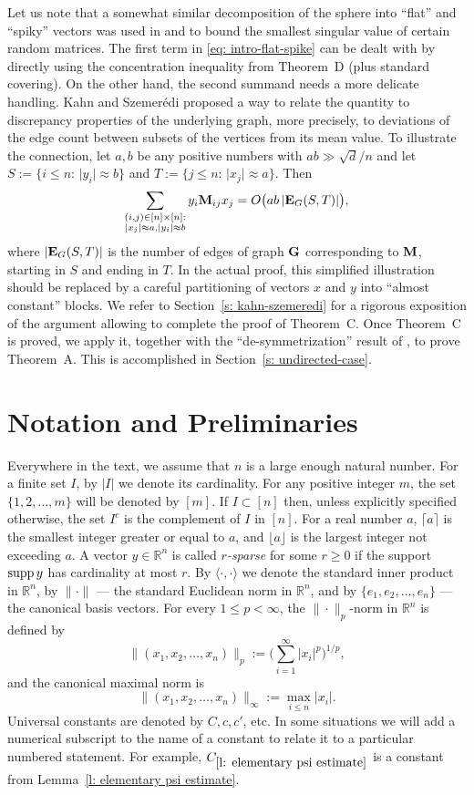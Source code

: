 \documentclass[12pt]{article}
\theoremstyle{definition}
\theoremstyle{plain}
\newcommand{\R}{\mathbb{R}}
\newcommand{\supp}{{\rm supp\,}}
\def\nrangr{G}
\def\rangr{{\bf{}G}}
\def\ranmtx{{\bf{}M}}
\def\edg{{\bf E}_{\nrangr}}
\begin{document}
Let us note that a somewhat similar decomposition of the sphere into ``flat''
and ``spiky'' vectors was used in \cite{nicole-sasha} 
and \cite{RV} to bound the smallest singular value of certain random matrices. 
The first term in \eqref{eq: intro-flat-spike} can be dealt with by directly using the concentration inequality from Theorem~D
(plus standard covering).
On the other hand, the second summand needs a more delicate handling.
Kahn and Szemer\'edi proposed a way to relate the quantity to discrepancy properties of the underlying graph,
more precisely, to deviations of the edge count between subsets of the vertices from its mean value.
To illustrate the connection, let $a,b$ be any positive numbers with $ab\gg \sqrt{d}/n$ and let
$S:=\{i\leq n:\, \vert y_i\vert \approx b\}$ and $T:=\{j\leq n:\, \vert x_j\vert \approx a\}$.
Then
$$\sum_{\substack{(i,j)\in[n]\times[n]:\\ |x_j|\approx a,|y_i|\approx b}} y_i\ranmtx_{ij}x_j=O\big(ab\, |\edg(S, T)|\big),$$
where $|\edg(S,T)|$ is the number of edges of graph $\rangr$ corresponding to $\ranmtx$,
starting in $S$ and ending in $T$.
In the actual proof, this simplified illustration should be replaced by 
a careful partitioning of vectors $x$ and $y$ into ``almost constant'' blocks.  
We refer to Section~\ref{s: kahn-szemeredi} for a rigorous exposition
of the argument allowing to complete the proof of Theorem~C. 
Once Theorem~C is proved, we apply it, together with the ``de-symmetrization'' result of \cite{TY_short},
to prove Theorem~A. This is accomplished in Section~\ref{s: undirected-case}.


\section{Notation and Preliminaries}\label{s: global notation}

Everywhere in the text, we assume that $n$ is a large enough natural number.
For a finite set $I$, by $|I|$ we denote its cardinality.
For any positive integer $m$, the set $\{1,2,\ldots,m\}$ will be denoted by $[m]$.
If $I\subset[n]$ then,
unless explicitly specified otherwise, the set $I^c$ is the complement of $I$ in $[n]$.
For a real number $a$, $\lceil a\rceil$ is the smallest integer greater or equal to $a$, and
$\lfloor a\rfloor$ is the largest integer not exceeding $a$.
A vector $y\in\R^n$ is called {\it $r$-sparse} for some $r\geq 0$ if the support $\supp y$
has cardinality at most $r$.
By $\langle \cdot,\cdot\rangle$
we denote the standard inner product in $\R^n$, by $\|\cdot\|$ --- the standard Euclidean norm in $\R^n$,
and by $\{e_1,e_2,\ldots,e_n\}$ --- the canonical basis vectors.
For every $1\leq p<\infty$, the $\|\cdot\|_p$-norm in $\R^n$ is defined by
$$\|(x_1,x_2,\dots,x_n)\|_p:=\bigg(\sum_{i=1}^\infty |x_i|^p\bigg)^{1/p},$$
and the canonical maximal norm is
$$\|(x_1,x_2,\dots,x_n)\|_\infty:=\max\limits_{i\leq n}|x_i|.$$
Universal constants are denoted by $C,c,c'$, etc.
In some situations we will add a numerical subscript to the name of a constant
to relate it to a particular numbered statement. For example, $C_{\ref{l: elementary psi estimate}}$
is a constant from Lemma~\ref{l: elementary psi estimate}.
\end{document}
